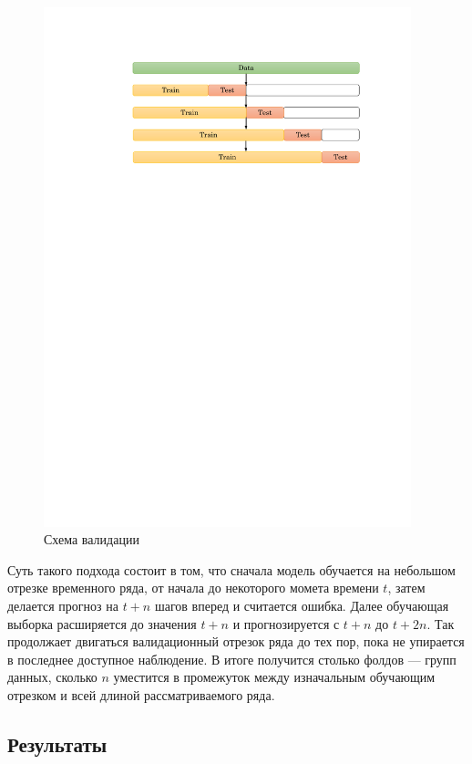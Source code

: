 \documentclass[14pt]{extarticle}
\begin{document}
\begin{figure}[h]
	\centering
	\includegraphics[width=0.95\textwidth]{img/sliding_window_val.pdf}
	\caption{Схема валидации}
	\label{fig:sliding_window}
\end{figure}

Суть такого подхода состоит в том, что сначала модель обучается на небольшом отрезке временного ряда, от начала до некоторого момета времени $t$, затем делается прогноз на $t + n$  шагов вперед и считается ошибка. Далее обучающая выборка расширяется до  значения $t + n$ и прогнозируется с $t + n$ до $t + 2n$. Так продолжает двигаться валидационный отрезок ряда до тех пор, пока не упирается в последнее доступное наблюдение. В итоге получится столько фолдов --- групп данных, сколько $n$ уместится в промежуток между изначальным обучающим отрезком и всей длиной рассматриваемого ряда.

\subsection{Результаты}
\end{document}

